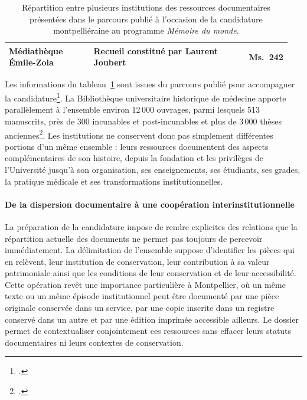 \begin{landscape}
\begin{table}[p]
\begin{tabular}{
				@{}
				p{0.30\linewidth}
				p{0.55\linewidth}
				p{0.10\linewidth}
				@{}
			}
			\addlinespace[0.3em]
			
			Médiathèque Émile-Zola
			& Recueil constitué par Laurent Joubert
			& Ms.~242 \\
			
			\bottomrule
		\end{tabular}
		
		\caption[Répartition des ressources du parcours \emph{Mémoire du monde}]
		{Répartition entre plusieurs institutions des ressources documentaires présentées dans le parcours publié à l'occasion de la candidature montpelliéraine au programme \emph{Mémoire du monde}.}
		\label{tab:memoire-monde-repartition}
	\end{table}
\end{landscape}

Les informations du tableau~\ref{tab:memoire-monde-repartition} sont issues du parcours publié pour accompagner la candidature\footcite{ParcoursCandidatureUNESCO2025}. La Bibliothèque universitaire historique de médecine apporte parallèlement à l'ensemble environ 12\,000 ouvrages, parmi lesquels 513 manuscrits, près de 300 incunables et post-incunables et plus de 3\,000 thèses anciennes\footcite{ParcoursCandidatureUNESCO2025}. Les institutions ne conservent donc pas simplement différentes portions d'un même ensemble : leurs ressources documentent des aspects complémentaires de son histoire, depuis la fondation et les privilèges de l'Université jusqu'à son organisation, ses enseignements, ses étudiants, ses grades, la pratique médicale et ses transformations institutionnelles.


\paragraph{De la dispersion documentaire à une coopération interinstitutionnelle}

La préparation de la candidature impose de rendre explicites des relations que la répartition actuelle des documents ne permet pas toujours de percevoir immédiatement. La délimitation de l'ensemble suppose d'identifier les pièces qui en relèvent, leur institution de conservation, leur contribution à sa valeur patrimoniale ainsi que les conditions de leur conservation et de leur accessibilité. Cette opération revêt une importance particulière à Montpellier, où un même texte ou un même épisode institutionnel peut être documenté par une pièce originale conservée dans un service, par une copie inscrite dans un registre conservé dans un autre et par une édition imprimée accessible ailleurs. Le dossier permet de contextualiser conjointement ces ressources sans effacer leurs statuts documentaires ni leurs contextes de conservation.

